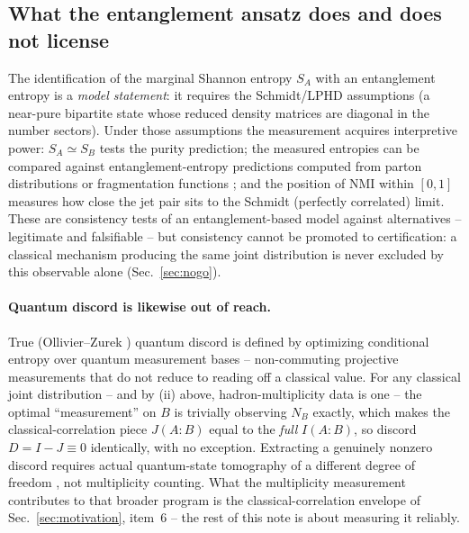 \documentclass[11pt]{article}
\newcommand{\NMI}{\mathrm{NMI}}
\begin{document}
\subsection{What the entanglement ansatz does and does not license}

The identification of the marginal Shannon entropy $S_A$ with an
entanglement entropy is a \emph{model statement}: it requires the
Schmidt/LPHD assumptions (a near-pure bipartite state whose reduced
density matrices are diagonal in the number sectors). Under those
assumptions the measurement acquires interpretive power: $S_A\simeq S_B$
tests the purity prediction; the measured entropies can be compared
against entanglement-entropy predictions computed from parton
distributions or fragmentation functions \cite{KL2017,TKU2020,H1_2021,
Datta2025}; and the position of $\NMI$ within $[0,1]$ measures how close
the jet pair sits to the Schmidt (perfectly correlated) limit. These are
consistency tests of an entanglement-based model against alternatives --
legitimate and falsifiable -- but consistency cannot be promoted to
certification: a classical mechanism producing the same joint
distribution is never excluded by this observable alone
(Sec.~\ref{sec:nogo}).

\paragraph{Quantum discord is likewise out of reach.} True
(Ollivier--Zurek \cite{OZ2001}) quantum discord is defined by optimizing
conditional entropy over quantum measurement bases -- non-commuting
projective measurements that do not reduce to reading off a classical
value. For any classical joint distribution -- and by (ii) above,
hadron-multiplicity data is one -- the optimal ``measurement'' on $B$ is
trivially observing $N_B$ exactly, which makes the classical-correlation
piece $J(A{:}B)$ equal to the \emph{full} $I(A{:}B)$, so discord
$D=I-J\equiv0$ identically, with no exception. Extracting a genuinely
nonzero discord requires actual quantum-state tomography of a different
degree of freedom \cite{AfikDeNova2023,GPTV2022}, not multiplicity
counting. What the multiplicity measurement contributes to that broader
program is the classical-correlation envelope of
Sec.~\ref{sec:motivation}, item~6 -- the rest of this note is about
measuring it reliably.

\end{document}
